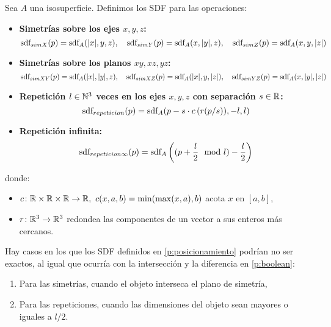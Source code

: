 \begin{proposicion}\label{p:posicionamiento}
    Sea $A$ una isosuperficie. Definimos los SDF para las operaciones:
    \begin{itemize}
        \item \textbf{Simetrías sobre los ejes $x,y,z$:}
        \begin{equation*}
            \text{sdf}_{simX}(p) = \text{sdf}_{A}(\vert x\vert, y, z),\quad \text{sdf}_{simY}(p) = \text{sdf}_{A}(x, \vert y\vert,  z),\quad \text{sdf}_{simZ}(p) = \text{sdf}_{A}(x,y,\vert z\vert)
        \end{equation*}
        \item \textbf{Simetrías sobre los planos $xy,xz,yz$:}
        \begin{equation*}
            \text{sdf}_{simXY}(p) = \text{sdf}_{A}(\vert x\vert, \vert y\vert, z),\quad \text{sdf}_{simXZ}(p) = \text{sdf}_{A}(\vert x\vert, y,  \vert z\vert),\quad \text{sdf}_{simYZ}(p) = \text{sdf}_{A}(x,\vert y\vert ,\vert z\vert)
        \end{equation*}
        \item \textbf{Repetición $l\in \mathbb{N}^3$ veces en los ejes $x,y,z$ con separación $s\in\mathbb{R}$:} 
        \begin{equation*}
            \text{sdf}_{repeticion}(p) = \text{sdf}_{A}(p - s\cdot c\left(r(p/s)), -l, l\right)
        \end{equation*}
        \item \textbf{Repetición infinita:}
        \begin{equation*}
            \text{sdf}_{repeticion\infty}(p) = \text{sdf}_{A}\left((p+\frac{l}{2}\mod l )- \frac{l}{2}\right)
        \end{equation*}
    \end{itemize}
    donde:
    \begin{itemize}
        \item $c\colon \R\times\R\times\R\to \R,\ c(x,a,b) = \min(\max(x, a), b)$ acota $x$ en $[a,b]$,
        \item $r\colon \mathbb{R}^3 \to \mathbb{R}^3$ redondea las componentes de un vector a sus enteros más cercanos.
    \end{itemize}
\end{proposicion}
\begin{observacion}
    Hay casos en los que los SDF definidos en \autoref{p:posicionamiento} podrían no ser exactos, al igual que ocurría con la intersección y la diferencia en \autoref{p:boolean}:
    \begin{enumerate}
        \item Para las simetrías, cuando el objeto interseca el plano de simetría,
        \item Para las repeticiones, cuando las dimensiones del objeto sean mayores o iguales a $l/2$.
    \end{enumerate}
\end{observacion}


